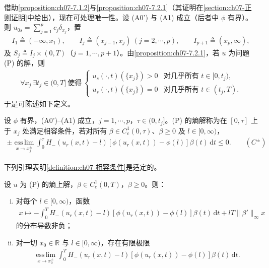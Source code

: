 \documentclass[../../main.tex]{subfiles}%
\begin{document}
借助\cref{proposition:ch07-7.1.2}与\cref{proposition:ch07-7.2.1}（其证明在\cref{section:ch07-正则证明}中给出），现在可处理唯一性。设 (A0') 与 (A1) 成立（后者中 $\phi$ 有界）。则 $u_{0s}=\sum_{j=1}^p c_j\delta_{x_j}$，置
\begin{align*}
I_1\triangleq (-\infty,x_1),\qquad I_j\triangleq (x_{j-1},x_j)\ (j=2,\cdots ,p),\qquad I_{p+1}\triangleq (x_p,\infty),
\end{align*}
及 $S_j\triangleq I_j\times(0,T)$（$j=1,\cdots ,p+1$）。由\cref{proposition:ch07-7.2.1}，若 $u$ 为问题 (P) 的解，则
\begin{align*}
\forall x_j\ \exists t_j\in(0,T]\ \text{使得}\ 
\begin{cases}
u_s(\cdot,t)(\{x_j\})>0 & \text{对几乎所有 }t\in[0,t_j),\\
u_s(\cdot,t)(\{x_j\})=0 & \text{对几乎所有 }t\in(t_j,T).
\end{cases}
\end{align*}
于是可陈述如下定义。

\begin{definition}\label{definition:ch07-相容条件}
设 $\phi$ 有界，(A0')--(A1) 成立，$j=1,\cdots ,p$，$\tau\in(0,t_j]$。(P) 的熵解称为在 $[0,\tau]$ 上于 $x_j$ 处满足相容条件，若对所有 $\beta\in C^1_c(0,\tau)$、$\beta\geqslant0$ 及 $l\in[0,\infty)$，
\begin{align*}
\pm\operatorname*{ess\,lim}_{x\to x_j^\pm}\int_0^\tau H_-(u_r(x,t)-l)[\phi(u_r(x,t))-\phi(l)]\beta(t)\,\mathrm{d}t\leqslant0. \qquad(C^\pm)
\end{align*}
\end{definition}

下列引理表明\cref{definition:ch07-相容条件}是适定的。

\begin{lemma}\label{lemma:ch07-7.2.3}
设 $u$ 为 (P) 的熵上解，$\beta\in C^1_c(0,T)$，$\beta\geqslant0$。则：
\begin{enumerate}[(i)]
\item 对每个 $l\in[0,\infty)$，函数
\begin{align}
x\mapsto-\int_0^T H_-(u_r(x,t)-l)[\phi(u_r(x,t))-\phi(l)]\beta(t)\,\mathrm{d}t+lT\|\beta'\|_\infty x \label{align:ch07-7.21}
\end{align}
的分布导数非负；
\item 对一切 $x_0\in\mathbb{R}$ 与 $l\in[0,\infty)$，存在有限极限
\begin{align}
\operatorname*{ess\,lim}_{x\to x_0^\pm}\int_0^T H_-(u_r(x,t)-l)[\phi(u_r(x,t))-\phi(l)]\beta(t)\,\mathrm{d}t. \label{align:ch07-7.22}
\end{align}
\end{enumerate}
\end{lemma}
\end{document}
